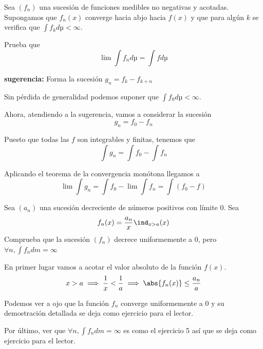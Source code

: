 \begin{problem}[9]

Sea $(f_n)$ una sucesión de funciones medibles no negativas y acotadas. Supongamos que $f_n(x)$ converge hacia abjo hacia $f(x)$ y que para algún $k$ se verifica que $\int f_k dµ < \infty$.

Prueba que
\[\lim \int f_n dµ = \int f dµ\]

\textbf{sugerencia:} Forma la sucesión $g_n = f_k -f_{k+n}$

\solution

Sin pérdida de generalidad podemos suponer que $\int f_0 dµ < \infty$.

Ahora, atendiendo a la sugerencia, vamos a considerar la sucesión
\[g_n = f_0 - f_n\]

Puesto que todas las $f$ son integrables y finitas, tenemos que
\[\int g_n = \int f_0 - \int f_n\]

Aplicando el teorema de la convergencia monótona llegamos a
\[\lim \int g_n = \int f_0 - \lim \int f_n = \int (f_0-f)\]
\end{problem}

\begin{problem}[10]
Sea $(a_n)$ una sucesión decreciente de números positivos con límite 0. Sea
\[f_n(x) = \frac{a_n}{x} \ind_{x > a}(x)\]
Comprueba que la sucesión $(f_n)$ decrece uniformemente a 0, pero $\forall n, \int f_n dm = \infty$

\solution

En primer lugar vamos a acotar el valor absoluto de la función $f(x)$.
\[x>a \implies \frac{1}{x} < \frac{1}{a} \implies \abs{f_n(x)} \leq \frac{a_n}{a}\]

Podemos ver a ojo que la función $f_n$ converge uniformemente a 0 y su demostración detallada se deja como ejercicio para el lector.

Por último, ver que $\forall n, \int f_n dm = \infty$ es como el ejercicio 5 así que se deja como ejercicio para el lector.
\end{problem}

